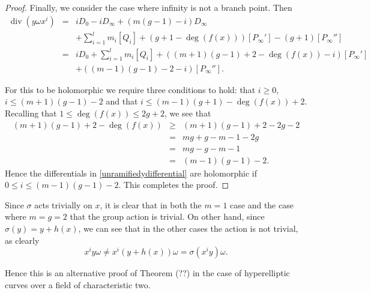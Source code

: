 \documentclass[11pt]{article} %
\theoremstyle{plain}
\theoremstyle{remark}
\DeclareMathOperator{\di}{div}
\begin{document}
\begin{proof}
 
 Finally, we consider the case where infinity is not a branch point.
 Then 
 \begin{eqnarray}\label{unramifiedydifferential}
  \di(y\omega x^i) & = & iD_0 -iD_\infty + (m(g-1)-i)D_\infty \\ & & 
  +\sum_{i=1}^l m_i[Q_i] +(g+1-\deg(f(x)))[P_\infty'] -(g+1)[P_\infty''] \\
 & = & iD_0 + \sum_{i=1}^l m_i[Q_i] + ((m+1)(g-1) + 2 - \deg(f(x)) -i)[P_\infty']\\
 & & +((m-1)(g-1)-2-i)[P_\infty''].
 \end{eqnarray}
 
For this to be holomorphic we require three conditions to hold: that $i\geq 0$, $i\leq (m+1)(g-1)-2$ and that $i \leq (m-1)(g+1) - \deg(f(x)) + 2$.
Recalling that $1 \leq \deg(f(x)) \leq 2g+2$, we see that 
\begin{eqnarray*}
 (m+1)(g-1)+2 - \deg(f(x)) & \geq & (m+1)(g-1) + 2 - 2g-2 \\
 & = & mg + g - m - 1 - 2g \\
 & = & mg - g -m -1 \\
 &= & (m-1)(g-1) - 2.
\end{eqnarray*}
Hence the differentials in \eqref{unramifiedydifferential} are holomorphic if $0 \leq i \leq (m-1)(g-1)-2$.
This completes the proof.
\end{proof}

  Since $\sigma$ acts trivially on $x$, it is clear that in both the $m=1$ case and the case where $m=g=2$ that the group action is trivial.
  On other hand, since $\sigma(y) = y+h(x)$, we can see that in the other cases the action is not trivial, as clearly
  \[
    x^iy\omega \neq x^i(y+h(x))\omega = \sigma(x^iy)\omega.
  \]

  Hence this is an alternative proof of Theorem (??) in the case of hyperelliptic curves over a field of characteristic two.



%

\end{document}
